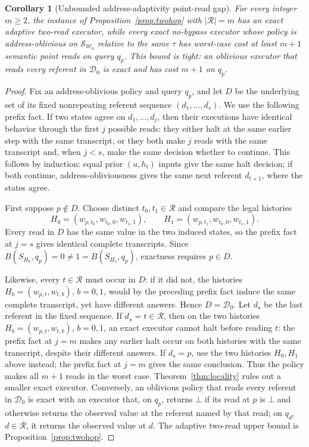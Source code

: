 \documentclass[11pt]{article}
\theoremstyle{definition}
\theoremstyle{plain}
\newtheorem{corollary}{Corollary}
\newcommand{\Dom}{\mathcal{D}}
\newcommand{\Wr}{\mathcal{W}}
\newcommand{\bt}{\bot}
\begin{document}
\begin{corollary}[Unbounded address-adaptivity point-read gap]
  \label{cor:gap}
For every integer \(m\geq2\), the instance of
Proposition~\ref{prop:twohop} with \(\lvert\mathcal R\rvert=m\) has an
exact adaptive two-read executor, while every exact no-bypass executor whose
policy is address-oblivious on \(\mathcal S_{\Wr_0}\) relative to the same
\(\tau\) has worst-case cost at least \(m+1\) semantic point reads on
query \(q_p\).  This bound is tight: an oblivious executor that reads every
referent in \(\Dom_0\) is exact and has cost \(m+1\) on \(q_p\).
\end{corollary}

\begin{proof}
Fix an address-oblivious policy and query \(q_p\), and let \(D\) be the
underlying set of its fixed nonrepeating referent sequence
\((d_1,\ldots,d_s)\).  We use the following prefix fact.  If two states
agree on \(d_1,\ldots,d_j\), then their executions have identical behavior
through the first \(j\) possible reads: they either halt at the same earlier
step with the same transcript, or they both make \(j\) reads with the same
transcript and, when \(j<s\), make the same decision whether to continue.
This follows by induction: equal prior \((u,h_t)\) inputs give the same halt
decision; if both continue, address-obliviousness gives the same next
referent \(d_{t+1}\), where the states agree.

First suppose \(p\notin D\).  Choose distinct \(t_0,t_1\in\mathcal R\) and compare
the legal histories
\[
 H_0=(w_{p,t_0},w_{t_0,0},w_{t_1,1}),
 \qquad
 H_1=(w_{p,t_1},w_{t_0,0},w_{t_1,1}).
\]
Every read in \(D\) has the same value in the two induced states, so the
prefix fact at \(j=s\) gives identical complete transcripts.  Since
\(B(S_{H_0},q_p)=0\neq1=B(S_{H_1},q_p)\), exactness requires \(p\in D\).

Likewise, every \(t\in\mathcal R\) must occur in \(D\): if it did not,
the histories \(H_b=(w_{p,t},w_{t,b})\), \(b=0,1\), would by the preceding
prefix fact induce the same complete transcript, yet have different answers.  Hence
\(D=\Dom_0\).  Let \(d_\star\) be the last referent in the fixed sequence.
If \(d_\star=t\in\mathcal R\), then on the two histories
\(H_b=(w_{p,t},w_{t,b})\), \(b=0,1\), an exact executor cannot halt before
reading \(t\): the prefix fact at \(j=m\) makes any earlier halt occur on
both histories with the same transcript, despite their different answers.
If \(d_\star=p\), use the two histories \(H_0,H_1\) above instead; the
prefix fact at \(j=m\) gives the same conclusion.  Thus the policy makes
all \(m+1\) reads in the worst case.
Theorem~\ref{thm:locality} rules out a smaller exact executor.  Conversely,
an oblivious policy that reads every referent in \(\Dom_0\) is exact with an
executor that, on \(q_p\), returns \(\bt\) if its read at \(p\) is \(\bt\)
and otherwise returns the observed value at the referent named by that read;
on \(q_d\), \(d\in\mathcal R\), it returns the observed value at \(d\).
The adaptive two-read upper bound is Proposition~\ref{prop:twohop}.
\end{proof}
\end{document}
